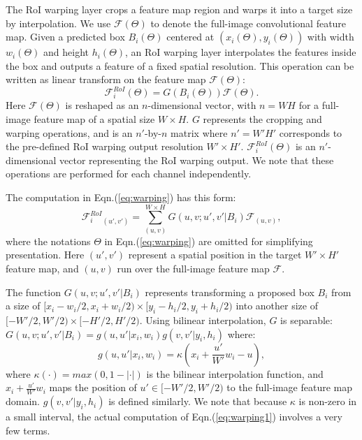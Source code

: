 \documentclass[10pt,twocolumn,letterpaper]{article}
\begin{document}
The RoI warping layer crops a feature map region and warps it into a target size by interpolation.
We use $\mathcal{F}(\Theta)$ to denote the full-image convolutional feature map. Given a predicted box $B_i(\Theta)$ centered at $(x_i(\Theta), y_i(\Theta))$ with width $w_i(\Theta)$ and height $h_i(\Theta)$, an RoI warping layer interpolates the features inside the box and outputs a feature of a fixed spatial resolution. This operation can be written as linear transform on the feature map $\mathcal{F}(\Theta)$:
\begin{equation}\label{eq:warping}
\mathcal{F}^{RoI}_i(\Theta)=G(B_i(\Theta))\mathcal{F}(\Theta).
\end{equation}
Here $\mathcal{F}(\Theta)$ is reshaped as an $n$-dimensional vector, with $n=WH$ for a full-image feature map of a spatial size $W\times H$. $G$ represents the cropping and warping operations, and is an $n'$-by-$n$ matrix where $n'=W'H'$ corresponds to the pre-defined RoI warping output resolution $W'\times H'$.
$\mathcal{F}^{RoI}_i(\Theta)$ is an $n'$-dimensional vector representing the RoI warping output. We note that these operations are performed for each channel independently.

The computation in Eqn.(\ref{eq:warping}) has this form:
\begin{equation}\label{eq:warping1}
\mathcal{F}^{RoI}_i{_{(u', v')}}=\sum^{W\times H }_{(u,v)}G(u, v; u', v' | B_i)\mathcal{F}_{(u, v)},
\end{equation}
where the notations $\Theta$ in Eqn.(\ref{eq:warping}) are omitted for simplifying presentation. Here $(u', v')$ represent a spatial position in the target $W'\times H'$ feature map, and $(u, v)$ run over the full-image feature map $\mathcal{F}$.

The function $G(u, v; u', v' | B_i)$ represents transforming a proposed box $B_i$ from a size of $[x_i-w_i/2, x_i+w_i/2)\times[y_i-h_i/2, y_i+h_i/2)$ into another size of $[-W'/2, W'/2)\times[-H'/2, H'/2)$. Using bilinear interpolation, $G$ is separable: $G(u, v; u', v' | B_i)=g(u, u' | x_i, w_i)g(v, v' | y_i, h_i)$ where:
\vspace{-.5em}
\begin{equation}
g(u, u' | x_i, w_i) = \kappa(x_i+\frac{u'}{W'}w_i-u),
\label{eq:warping2}
\end{equation}
where $\kappa(\cdot)=max(0, 1-|\cdot|)$ is the bilinear interpolation function, and $x_i+\frac{u'}{W'}w_i$ maps the position of $u'\in[-W'/2, W'/2)$ to the full-image feature map domain.
$g(v, v' | y_i, h_i)$ is defined similarly. We note that because $\kappa$ is non-zero in a small interval, the actual computation of Eqn.(\ref{eq:warping1}) involves a very few terms.
\end{document}
